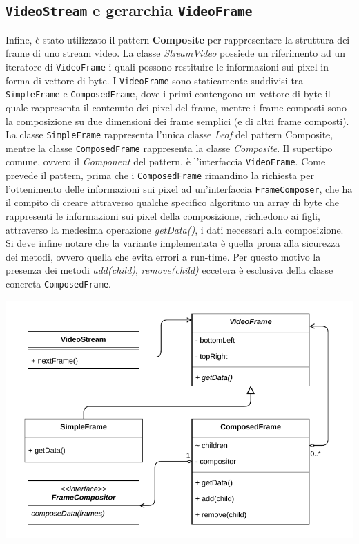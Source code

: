\documentclass[a4paper,11pt]{article}
\begin{document}
	
	\subsection{\texttt{VideoStream} e gerarchia \texttt{VideoFrame}}
	Infine, è stato utilizzato il pattern \textbf{Composite} per rappresentare la struttura dei frame di uno stream video. La classe \textit{StreamVideo} possiede un riferimento ad un iteratore di \texttt{VideoFrame} i quali possono restituire le informazioni sui pixel in forma di vettore di byte. I \texttt{VideoFrame} sono staticamente suddivisi tra \texttt{SimpleFrame} e \texttt{ComposedFrame}, dove i primi contengono un vettore di byte il quale rappresenta il contenuto dei pixel del frame, mentre i frame composti sono la composizione su due dimensioni dei frame semplici (e di altri frame composti). La classe \texttt{SimpleFrame} rappresenta l'unica classe \textit{Leaf} del pattern Composite, mentre la classe \texttt{ComposedFrame} rappresenta la classe \textit{Composite}. Il supertipo comune, ovvero il \textit{Component} del pattern, è l'interfaccia \texttt{VideoFrame}. 
	Come prevede il pattern, prima che i \texttt{ComposedFrame} rimandino la richiesta per l'ottenimento delle informazioni sui pixel ad un'interfaccia \texttt{FrameComposer}, che ha il compito di creare attraverso qualche specifico algoritmo un array di byte che rappresenti le informazioni sui pixel della composizione, richiedono ai figli, attraverso la medesima operazione \textit{getData()}, i dati necessari alla composizione.
	Si deve infine notare che la variante implementata è quella prona alla sicurezza dei metodi, ovvero quella che evita errori a run-time. Per questo motivo la presenza dei metodi \textit{add(child)}, \textit{remove(child)} eccetera è esclusiva della classe concreta \texttt{ComposedFrame}.
	\begin{minipage}[c]{\textwidth}
		\centering
		\includegraphics[width=.5\textwidth]{diagramma/ClassDiagramm-VideoStream.pdf}
		\label{fig:videostream}
	\end{minipage}
	
\end{document}
